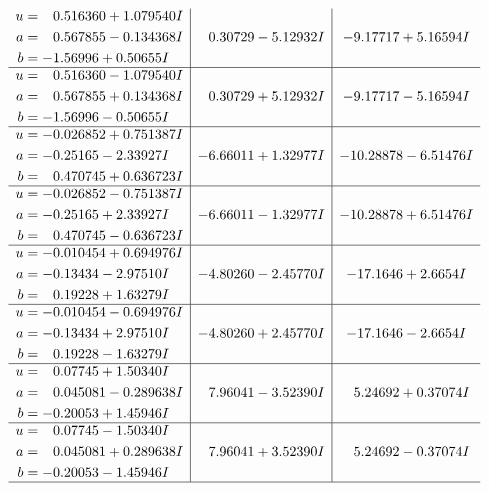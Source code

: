 \documentclass[1p]{elsarticle_modified}
\theoremstyle{definition}
\begin{document}
$$\begin{array}{c|c|c}
\begin{aligned}
u &= \phantom{-}0.516360 + 1.079540 I \\
a &= \phantom{-}0.567855 - 0.134368 I \\
b &= -1.56996 + 0.50655 I\end{aligned}
 & \phantom{-}0.30729 - 5.12932 I & -9.17717 + 5.16594 I \\ \hline\begin{aligned}
u &= \phantom{-}0.516360 - 1.079540 I \\
a &= \phantom{-}0.567855 + 0.134368 I \\
b &= -1.56996 - 0.50655 I\end{aligned}
 & \phantom{-}0.30729 + 5.12932 I & -9.17717 - 5.16594 I \\ \hline\begin{aligned}
u &= -0.026852 + 0.751387 I \\
a &= -0.25165 - 2.33927 I \\
b &= \phantom{-}0.470745 + 0.636723 I\end{aligned}
 & -6.66011 + 1.32977 I & -10.28878 - 6.51476 I \\ \hline\begin{aligned}
u &= -0.026852 - 0.751387 I \\
a &= -0.25165 + 2.33927 I \\
b &= \phantom{-}0.470745 - 0.636723 I\end{aligned}
 & -6.66011 - 1.32977 I & -10.28878 + 6.51476 I \\ \hline\begin{aligned}
u &= -0.010454 + 0.694976 I \\
a &= -0.13434 - 2.97510 I \\
b &= \phantom{-}0.19228 + 1.63279 I\end{aligned}
 & -4.80260 - 2.45770 I & -17.1646 + 2.6654 I \\ \hline\begin{aligned}
u &= -0.010454 - 0.694976 I \\
a &= -0.13434 + 2.97510 I \\
b &= \phantom{-}0.19228 - 1.63279 I\end{aligned}
 & -4.80260 + 2.45770 I & -17.1646 - 2.6654 I \\ \hline\begin{aligned}
u &= \phantom{-}0.07745 + 1.50340 I \\
a &= \phantom{-}0.045081 - 0.289638 I \\
b &= -0.20053 + 1.45946 I\end{aligned}
 & \phantom{-}7.96041 - 3.52390 I & \phantom{-}5.24692 + 0.37074 I \\ \hline\begin{aligned}
u &= \phantom{-}0.07745 - 1.50340 I \\
a &= \phantom{-}0.045081 + 0.289638 I \\
b &= -0.20053 - 1.45946 I\end{aligned}
 & \phantom{-}7.96041 + 3.52390 I & \phantom{-}5.24692 - 0.37074 I\\
 \hline 
 \end{array}$$\newpage\newpage\renewcommand{\arraystretch}{1}
\end{document}
